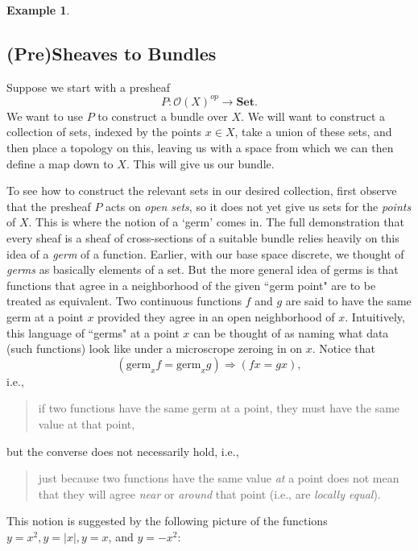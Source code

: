 \documentclass[a4paper]{book}
\theoremstyle{definition}
\newtheorem{example}{Example}[section]
\theoremstyle{definition}
\theoremstyle{definition}
\theoremstyle{theorem}
\theoremstyle{definition}
\begin{document}
\begin{example}
\subsection{(Pre)Sheaves to Bundles}	
	Suppose we start with a presheaf 
	\begin{equation*}
	P: \mathscr{O}(X)^{op} \rightarrow \textbf{Set}. 
	\end{equation*}
	We want to use $P$ to construct a bundle over $X$. We will want to construct a collection of sets, indexed by the points $x \in X$, take a union of these sets, and then place a topology on this, leaving us with a space from which we can then define a map down to $X$. This will give us our bundle. \par 
	To see how to construct the relevant sets in our desired collection, first observe that the presheaf $P$ acts on \textit{open sets}, so it does not yet give us sets for the \textit{points} of $X$. This is where the notion of a `germ' comes in. The full demonstration that every sheaf is a sheaf of cross-sections of a suitable bundle relies heavily on this idea of a \textit{germ} of a function. Earlier, with our base space discrete, we thought of \textit{germs} as basically elements of a set. But the more general idea of germs is that functions that agree in a neighborhood of the given ``germ point" are to be treated as equivalent. Two continuous functions $f$ and $g$ are said to have the same germ at a point $x$ provided they agree in an open neighborhood of $x$. Intuitively, this language of ``germs" at a point $x$ can be thought of as naming what data (such functions) look like under a microscrope zeroing in on $x$. Notice that 
	\begin{equation*}
	(\text{germ}_x f = \text{germ}_x g) \Rightarrow (fx = gx),
	\end{equation*} 
	i.e., 
	\begin{quote}
		if two functions have the same germ at a point, they must have the same value at that point,
	\end{quote}
	but the converse does not necessarily hold, i.e., 
	\begin{quote}
		just because two functions have the same value \textit{at} a point does not mean that they will agree \textit{near} or \textit{around} that point (i.e., are \textit{locally equal}).   
	\end{quote}  
	This notion is suggested by the following picture of the functions $y = x^2, y = |x|, y = x$, and $y = -x^2$:  
	\begin{center} 

\end{center}
\end{example}
\end{document}
